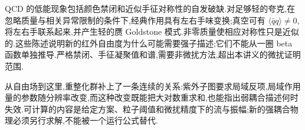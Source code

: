 QCD 的低能现象包括颜色禁闭和近似手征对称性的自发破缺.对足够轻的夸克,在忽略质量与相关异常限制的条件下,经典作用具有左右手味变换;真空可有 $\langle\bar q q\rangle\ne0$,将左右手联系起来,并产生轻的赝 Goldstone 模式.非零质量使相应对称性只是近似的.这些陈述说明新的红外自由度为什么可能需要强子描述;它们不能从一圈 beta 函数单独推导.严格禁闭、手征凝聚值和谱,需要非微扰方法,超出本讲义的微扰证明范围.

从自由场到这里,重整化群补上了一条连续的关系:紫外子图要求局域反项,局域作用量的参数随分辨率改变,而这种改变既能把大对数重求和,也能指出弱耦合描述何时失效.可计算的内容是给定方案、粒子阈值和微扰精度下的流与振幅;新的强耦合物理必须另行求解,不能被一个运行公式替代.
